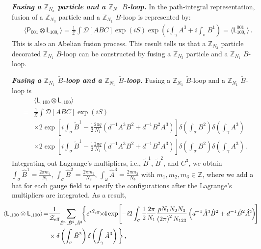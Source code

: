 \documentclass[11pt,nofootinbib,preprint]{revtex4-1}
\def\Z{\mathbb{Z}}
\begin{document}
\textbf{\textit{Fusing a $\mathbb{Z} _{N_3}$ particle and a $\mathbb{Z} _{N_1}$ $B$-loop.}}
In the path-integral representation, fusion of a $\mathbb{Z} _{N_3}$ particle and a $\mathbb{Z} _{N_1}$ $B$-loop is represented by:
\begin{align}
	&	\langle\mathsf{P}_{001}\otimes \mathsf{L}_{100,} \rangle  =\frac{1}{\mathcal{Z}}\int{\mathcal{D} \left[ ABC \right] \exp \left( iS \right) \exp \left( i\int_{\gamma}{A^3}+i\int_{\sigma}{B^1} \right)} =\langle \mathsf{L}_{100,}^{001} \rangle\,.
\end{align}
This is also an Abelian fusion process. This result tells us that a $\mathbb{Z} _{N_3}$ particle decorated $\mathbb{Z} _{N_1}$ $B$-loop can be constructed by fusing a $\mathbb{Z} _{N_3}$ particle and a $\mathbb{Z} _{N_1}$ $B$-loop.

\textbf{\textit{Fusing a $\mathbb{Z} _{N_1}$ $\tilde{B}$-loop and a $\mathbb{Z} _{N_1}$ $\tilde{B}$-loop.}}
Fusing a $\mathbb{Z} _{N_1}$ $\tilde{B}$-loop and a $\mathbb{Z} _{N_1}$ $\tilde{B}$-loop is 
\begin{align}
	&\langle \mathsf{L}_{,100}\otimes \mathsf{L}_{,100}\rangle \nonumber \\
	=&\frac{1}{\mathcal{Z}}\!\!\int{\!}\!\mathcal{D} \!\left[ ABC \right] \!\exp \left( iS \right) \nonumber
	\\
	&\times 2\exp \left[ i\int_{\sigma}{\tilde{B}^1-\frac{1}{2}\frac{2\pi q}{N_1}\left( d^{-1}A^3B^2+d^{-1}B^2A^3 \right)} \right] \delta \left( \int_{\sigma}{B^2} \right) \delta \left( \int_{\gamma}{A^3} \right) \nonumber
	\\
	&\times 2\exp \left[ i\!\int_{\sigma}{\tilde{B}^1-\frac{1}{2}\frac{2\pi q}{N_1}\left( d^{-1}A^3B^2+d^{-1}B^2A^3 \right)} \right] \delta \left( \int_{\sigma}{B^2} \right) \delta \left( \int_{\gamma}{A^3} \right) \,.
\end{align}
Integrating out Lagrange's multipliers, i.e., $\tilde{B}^1$, $\tilde{B}^2$, and $C^3$, we obtain $\int_{\sigma}{\hat{B}^1}=\frac{2\pi m_1}{N_1}$, $\int_{\sigma}{\hat{B}^2}=\frac{2\pi m_2}{N_2}$, $\int_{\omega}{\hat{A}^3}=\frac{2\pi m_3}{N_3}$ with $m_1,m_2,m_3\in\Z$, where we add a hat for each gauge field to specify the configurations after the Lagrange's multipliers are integrated. As a result, 
\begin{align}
	\!\!\!\!\!\!	\!\!\langle \mathsf{L}_{,100}\otimes \mathsf{L}_{,100}\rangle\!=&\frac{1}{\mathcal{Z}_{\rm eff}}   \!\!\sum_{\hat{B}^1,\hat{B}^2,\hat{A}^3}\!\! \bigg\{e^{iS_{\rm eff}}  \!\!
	\times \!\!4\exp\! \left[ -i2\int_{\sigma}{\frac{1}{2}\frac{2\pi}{N_1}\frac{pN_1N_2N_3}{\left( 2\pi \right) ^2N_{123}}\left( d^{-1}\hat{A}^3\hat{B}^2+d^{-1}\hat{B}^2\hat{A}^3 \!\right)} \!\right] \nonumber
	\\
	&\times \delta \left( \int_{\sigma}{\hat{B}^2} \right) \delta \left( \int_{\gamma}{\hat{A}^3} \right)     \bigg\}\,,
	\label{eq_illustrate_loop_nonAbelianfusion}
\end{align}
\end{document}

